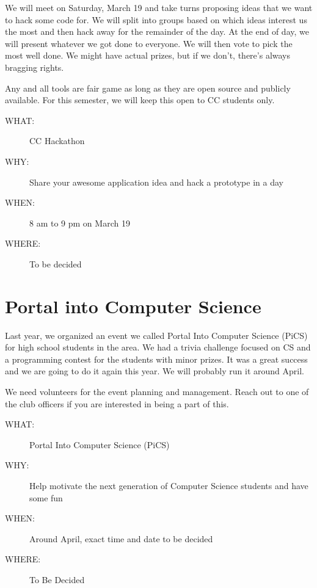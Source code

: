 We will meet on Saturday, March 19 and take turns proposing ideas that we want
to hack some code for. We will split into groups based on which ideas interest
us the most and then hack away for the remainder of the day. At the end of day,
we will present whatever we got done to everyone. We will then vote to pick the
most well done. We might have actual prizes, but if we don't, there's always
bragging rights.

Any and all tools are fair game as long as they are open source and publicly
available. For this semester, we will keep this open to CC students only.

\begin{description}
\item[{WHAT:}] CC Hackathon
\item[{WHY:}] Share your awesome application idea and hack a prototype in a day
\item[{WHEN:}] 8 am to 9 pm on March 19
\item[{WHERE:}] To be decided
\end{description}


\newpage


\section{Portal into Computer Science}
\label{sec-8}

Last year, we organized an event we called Portal Into Computer Science (PiCS)
for high school students in the area. We had a trivia challenge focused on CS
and a programming contest for the students with minor prizes. It was a great
success and we are going to do it again this year. We will probably run it
around April.

We need volunteers for the event planning and management. Reach out to one of
the club officers if you are interested in being a part of this.

\begin{description}
\item[{WHAT:}] Portal Into Computer Science (PiCS)
\item[{WHY:}] Help motivate the next generation of Computer Science students and have some fun
\item[{WHEN:}] Around April, exact time and date to be decided
\item[{WHERE:}] To Be Decided
\end{description}


\newpage


